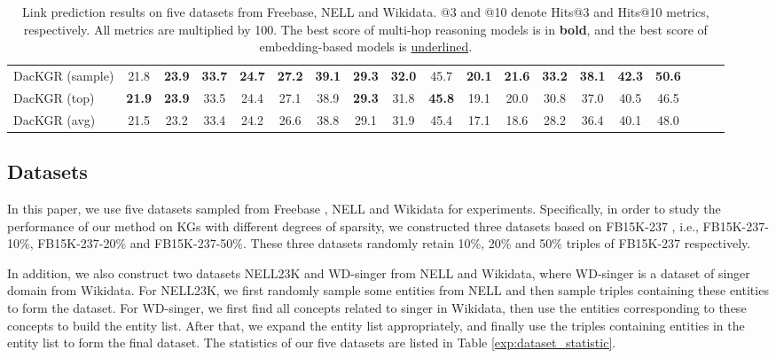 \documentclass[11pt,a4paper]{article}
\begin{document}
\begin{table}[tb]
{\begin{tabular}{lcccccccccccccccccc}
  \midrule
  DacKGR (sample) & 21.8 & \textbf{23.9} & \textbf{33.7} & \textbf{24.7} & \textbf{27.2}  & \textbf{39.1} & \textbf{29.3} & \textbf{32.0} & 45.7 & \textbf{20.1}  & \textbf{21.6} & \textbf{33.2} & \textbf{38.1}  & \textbf{42.3} & \textbf{50.6}  \\ 
  DacKGR (top) & \textbf{21.9} & \textbf{23.9} & 33.5 & 24.4 & 27.1  & 38.9 & \textbf{29.3} & 31.8 & \textbf{45.8} & 19.1  & 20.0 & 30.8 & 37.0  & 40.5 & 46.5 \\ 
  DacKGR (avg) & 21.5 & 23.2 & 33.4 & 24.2 & 26.6  & 38.8 & 29.1 & 31.9 & 45.4 & 17.1  & 18.6 & 28.2 & 36.4  & 40.1 & 48.0  \\ 
  \bottomrule
  \end{tabular}
  }
  \vspace{-0.1cm}
  \caption{Link prediction results on five datasets from Freebase, NELL and Wikidata. @3 and @10 denote Hits@3 and Hits@10 metrics, respectively. All metrics are multiplied by 100. The best score of multi-hop reasoning models is in \textbf{bold}, and the best score of embedding-based models is \underline{underlined}.}
  \label{fb15k-lp}
  \vspace{-0.2cm}
  \end{table}

\subsection{Datasets}

In this paper, we use five datasets sampled from Freebase \cite{Freebase}, NELL \cite{NELL} and Wikidata \cite{Wikidata} for experiments. Specifically, in order to study the performance of our method on KGs with different degrees of sparsity, we constructed three datasets based on FB15K-237 \cite{FB15K-237}, i.e., FB15K-237-10\%, FB15K-237-20\% and FB15K-237-50\%. These three datasets randomly retain 10\%, 20\% and 50\% triples of FB15K-237 respectively. 

In addition, we also construct two datasets NELL23K and WD-singer from NELL and Wikidata, where WD-singer is a dataset of singer domain from Wikidata. For NELL23K, we first randomly sample some entities from NELL and then sample triples containing these entities to form the dataset. For WD-singer, we first find all concepts related to singer in Wikidata, then use the entities corresponding to these concepts to build the entity list. After that, we expand the entity list appropriately, and finally use the triples containing entities in the entity list to form the final dataset. The statistics of our five datasets are listed in Table \ref{exp:dataset_statistic}.
\end{document}
